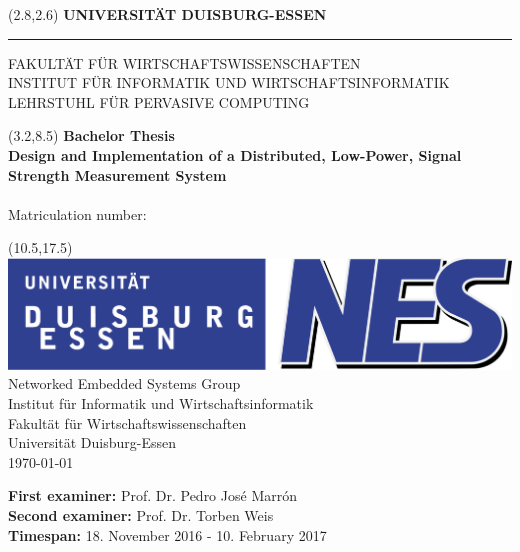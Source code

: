 \begin{titlepage}
\vspace*{-1cm}
\newlength{\links}
\setlength{\links}{0.9cm}
\setlength{\TPHorizModule}{1cm}
\setlength{\TPVertModule}{1cm}
\textblockorigin{0pt}{0pt}

\sf
\LARGE

\begin{textblock}{16.5}(2.8,2.6)
 \hspace*{-0.25cm} \textbf{UNIVERSITÄT DUISBURG-ESSEN} \\
 \hspace*{-1.15cm} \rule{5mm}{5mm} \hspace*{0.05cm} FAKULTÄT FÜR WIRTSCHAFTSWISSENSCHAFTEN\\
 \large{}INSTITUT FÜR INFORMATIK UND WIRTSCHAFTSINFORMATIK \\
 \large{}LEHRSTUHL FÜR PERVASIVE COMPUTING\\
\end{textblock}


\begin{textblock}{14.5}(3.2,8.5)
  \large
{ \bf Bachelor Thesis} \\[1cm]
{\LARGE \Large\bf Design and Implementation of a Distributed, Low-Power, Signal Strength Measurement System} \\[1.3cm]
\studentFirsName { } \studentSecondName\\
Matriculation number: \studentMatrikelnummer
\end{textblock}



\begin{textblock}{10}(10.5,17.5)
\includegraphics[scale=0.23	]{content/images/NES_Logo.pdf}\\
\normalsize
\raggedleft
Networked Embedded Systems Group \\
Institut für Informatik und Wirtschaftsinformatik \\
Fakultät für Wirtschaftswissenschaften \\
Universität Duisburg-Essen \\[2ex]

\today\\[15ex]
\raggedright
{\bf First examiner:} Prof. Dr. Pedro José Marrón \\
{\bf Second examiner:} Prof. Dr. Torben Weis \\
{\bf Timespan:} 18. November 2016 - 10. February 2017\\
\end{textblock}


\end{titlepage}
